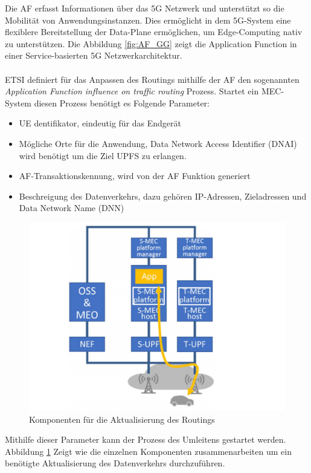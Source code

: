 \documentclass[runningheads]{llncs}
\numberwithin{figure}{section}
\begin{document}
Die AF erfasst Informationen über das 5G Netzwerk und unterstützt so die Mobilität von Anwendungsinstanzen. 
Dies ermöglicht in dem 5G-System eine flexiblere Bereitstellung der Data-Plane ermöglichen, um Edge-Computing nativ zu unterstützen.
Die Abbildung \ref{fig:AF_GG} zeigt die Application Function in einer Service-basierten 5G Netzwerkarchitektur.
\\
\\
ETSI definiert für das Anpassen des Routings mithilfe der AF den sogenannten \textit{Application Function influence on traffic routing} Prozess.
Startet ein MEC-System diesen Prozess benötigt es Folgende Parameter:
\begin{itemize}
  \item UE dentifikator, eindeutig für das Endgerät
  \item Mögliche Orte für die Anwendung,  Data Network Access Identifier (DNAI) wird benötigt um die Ziel UPFS zu erlangen.
  \item AF-Transaktionskennung, wird von der AF Funktion generiert
  \item Beschreigung des Datenverkehrs, dazu gehören IP-Adressen, Zieladressen und Data Network Name (DNN)
\end{itemize}
\begin{figure}
  \includegraphics[width=\linewidth]{images/Datenverkehr_Update.png}
  \caption{Komponenten für die Aktualisierung des Routings}
  \label{fig:Datenverkehr_Update}
\end{figure}
Mithilfe dieser Parameter kann der Prozess des Umleitens gestartet werden.
Abbildung \ref{fig:Datenverkehr_Update} Zeigt wie die einzelnen Komponenten zusammenarbeiten um ein benötigte Aktualisierung des Datenverkehrs durchzuführen.
\end{document}
